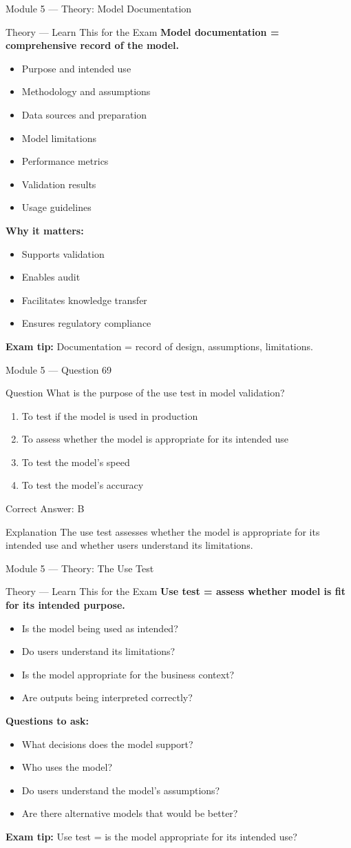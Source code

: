 \documentclass[aspectratio=169,10pt]{beamer}
\newcommand{\question}[1]{%
	\begin{block}{Question}
		#1
	\end{block}
}
\newcommand{\options}[4]{%
	\begin{enumerate}[label=\Alph*.,leftmargin=*]
		\item #1
		\item #2
		\item #3
		\item #4
	\end{enumerate}
}
\newcommand{\answerbox}[1]{%
	\begin{exampleblock}{Correct Answer: #1}
	\end{exampleblock}
}
\newcommand{\explain}[1]{%
	\begin{block}{Explanation}
		\small #1
	\end{block}
}
\newcommand{\theory}[1]{%
	\begin{block}{Theory --- Learn This for the Exam}
		\small #1
	\end{block}
}
\begin{document}
	\begin{frame}{Module 5 --- Theory: Model Documentation}
		\theory{
			\textbf{Model documentation = comprehensive record of the model.}
			\begin{itemize}
				\item Purpose and intended use
				\item Methodology and assumptions
				\item Data sources and preparation
				\item Model limitations
				\item Performance metrics
				\item Validation results
				\item Usage guidelines
			\end{itemize}
			\textbf{Why it matters:}
			\begin{itemize}
				\item Supports validation
				\item Enables audit
				\item Facilitates knowledge transfer
				\item Ensures regulatory compliance
			\end{itemize}
			\textbf{Exam tip:} Documentation = record of design, assumptions, limitations.
		}
	\end{frame}
	
	\begin{frame}{Module 5 --- Question 69}
		\question{What is the purpose of the use test in model validation?}
		\options{To test if the model is used in production}{To assess whether the model is appropriate for its intended use}{To test the model's speed}{To test the model's accuracy}
		\answerbox{B}
		\explain{The use test assesses whether the model is appropriate for its intended use and whether users understand its limitations.}
	\end{frame}
	
	\begin{frame}{Module 5 --- Theory: The Use Test}
		\theory{
			\textbf{Use test = assess whether model is fit for its intended purpose.}
			\begin{itemize}
				\item Is the model being used as intended?
				\item Do users understand its limitations?
				\item Is the model appropriate for the business context?
				\item Are outputs being interpreted correctly?
			\end{itemize}
			\textbf{Questions to ask:}
			\begin{itemize}
				\item What decisions does the model support?
				\item Who uses the model?
				\item Do users understand the model's assumptions?
				\item Are there alternative models that would be better?
			\end{itemize}
			\textbf{Exam tip:} Use test = is the model appropriate for its intended use?
		}
	\end{frame}
	
\end{document}
